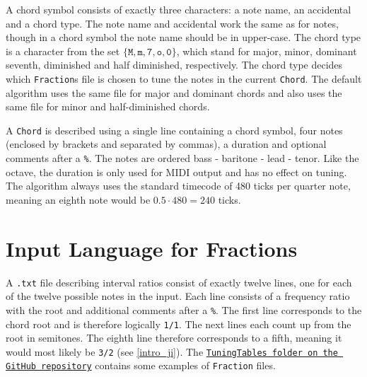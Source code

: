 \documentclass[a4paper]{article}
\begin{document}
\begin{appendices}
A chord symbol consists of exactly three characters: a note name, an accidental and a chord type. The note name and accidental work the same as for notes, though in a chord symbol the note name should be in upper-case. The chord type is a character from the set $\{\texttt{M}, \texttt{m}, \texttt{7}, \texttt{o}, \texttt{0}\}$, which stand for major, minor, dominant seventh, diminished and half diminished, respectively. The chord type decides which \texttt{Fraction}s file is chosen to tune the notes in the current \texttt{Chord}. The default algorithm uses the same file for major and dominant chords and also uses the same file for minor and half-diminished chords.

A \texttt{Chord} is described using a single line containing a chord symbol, four notes (enclosed by brackets and separated by commas), a duration and optional comments after a \texttt{\%}. The notes are ordered bass - baritone - lead - tenor. Like the octave, the duration is only used for MIDI output and has no effect on tuning. The algorithm always uses the standard \cite{dobrian_timing_2014} timecode of 480 ticks per quarter note, meaning an eighth note would be $0.5 \cdot 480 = 240$ ticks.

\section{Input Language for Fractions}
\label{input_fractions}
A \texttt{.txt} file describing interval ratios consist of exactly twelve lines, one for each of the twelve possible notes in the input. Each line consists of a frequency ratio with the root and additional comments after a \texttt{\%}. The first line corresponds to the chord root and is therefore logically \texttt{1/1}. The next lines each count up from the root in semitones. The eighth line therefore corresponds to a fifth, meaning it would most likely be \texttt{3/2} (see \ref{intro_ji}). The \texttt{\href{https://github.com/teuncb/AdaptiveBarbershop/tree/main/TuningTables}{TuningTables folder on the GitHub repository}} contains some examples of \texttt{Fraction} files.

\end{appendices}
\end{document}

